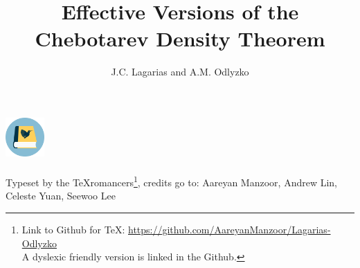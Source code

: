 \documentclass[twoside]{article}
\title{Effective Versions of the Chebotarev Density Theorem}
\author{J.C. Lagarias and A.M. Odlyzko}
\date{\vspace{-2em}}
\begin{document}
\maketitle

\renewcommand{\thefootnote}{$\dagger$}
\begin{center}
    \includegraphics[height=4em]{texromancers.pdf}\\ \phantom{1}\\
    Typeset by the TeXromancers\footnote{Link to Github for TeX: \url{https://github.com/AareyanManzoor/Lagarias-Odlyzko}\\ A dyslexic friendly version is linked in the Github.}, credits go to: Aareyan Manzoor, Andrew Lin, Celeste Yuan, Seewoo Lee %
\end{center}
\renewcommand{\thefootnote}{\arabic{footnote}}
 
\tableofcontents
{}

\pagestyle{fancy}











\pagestyle{plain}
\renewcommand*{\bibfont}{\small}
\printbibliography[
heading=bibintoc,
title={Bibliography},
]
\end{document}
